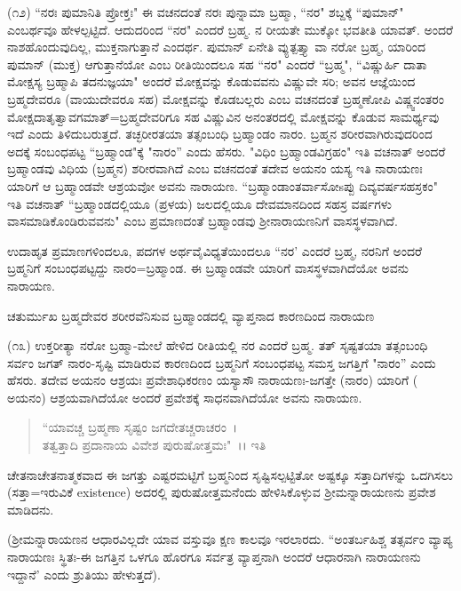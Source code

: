 (೧೨) “ನರಃ ಪುಮಾನಿತಿ ಪ್ರೋಕ್ತಃ" ಈ ವಚನದಂತೆ ನರಃ ಪುನ್ನಾಮಾ ಬ್ರಹ್ಮಾ, ``ನರ" ಶಬ್ದಕ್ಕೆ “ಪುಮಾನ್" ಎಂಬರ್ಥವೂ ಹೇಳಲ್ಪಟ್ಟಿದೆ. ಆದುದರಿಂದ ``ನರ" ಎಂದರೆ ಬ್ರಹ್ಮ. ನ ರೀಯತೇ ಮುಕ್ಕೋ ಭವತೀತಿ ಯಾವತ್. ಅಂದರೆ ನಾಶಹೊಂದುವುದಿಲ್ಲ, ಮುಕ್ತನಾಗುತ್ತಾನೆ ಎಂದರ್ಥ. ಪುಮಾನ್ ಏನೇತಿ ವ್ಯುತ್ಪತ್ತ್ಯಾ ವಾ ನರೋ ಬ್ರಹ್ಮ, ಯಾರಿಂದ ಪುಮಾನ್ (ಮುಕ್ತ) ಆಗುತ್ತಾನೆಯೋ ಎಂಬ ರೀತಿಯಿಂದಲೂ ಸಹ ``ನರ" ಎಂದರೆ ``ಬ್ರಹ್ಮ", ``ವಿಷ್ಣುರ್ಹಿ ದಾತಾ ಮೋಕ್ಷಸ್ಯ ಬ್ರಹ್ಮಾಪಿ ತದನುಜ್ಞಯಾ" ಅಂದರೆ ಮೋಕ್ಷವನ್ನು ಕೊಡುವವನು ವಿಷ್ಣುವೇ ಸರಿ; ಅವನ ಆಜ್ಞೆಯಿಂದ ಬ್ರಹ್ಮದೇವರೂ (ವಾಯುದೇವರೂ ಸಹ) ಮೋಕ್ಷವನ್ನು ಕೊಡಬಲ್ಲರು ಎಂಬ ವಚನದಂತೆ ಬ್ರಹ್ಮಣೋಪಿ ವಿಷ್ಣ್ವನಂತರಂ ಮೋಕ್ಷದಾತೃತ್ವಾವಗಮಾತ್=ಬ್ರಹ್ಮದೇವರಿಗೂ ಸಹ ವಿಷ್ಣುವಿನ ಅನಂತರದಲ್ಲಿ ಮೋಕ್ಷವನ್ನು ಕೊಡುವ ಸಾಮರ್ಥ್ಯವು ಇದೆ ಎಂದು ತಿಳಿದುಬರುತ್ತದೆ. ತಚ್ಛರೀರತಯಾ ತತ್ಸಂಬಂಧಿ ಬ್ರಹ್ಮಾಂಡಂ ನಾರಂ. ಬ್ರಹ್ಮನ ಶರೀರವಾಗಿರುವುದರಿಂದ ಅದಕ್ಕೆ ಸಂಬಂಧಪಟ್ಟ “ಬ್ರಹ್ಮಾಂಡ"ಕ್ಕೆ "ನಾರಂ'' ಎಂದು ಹೆಸರು. "ವಿಧಿಂ ಬ್ರಹ್ಮಾಂಡವಿಗ್ರಹಂ" ಇತಿ ವಚನಾತ್ ಅಂದರೆ ಬ್ರಹ್ಮಾಂಡವು ವಿಧಿಯ (ಬ್ರಹ್ಮನ) ಶರೀರವಾಗಿದೆ ಎಂಬ ವಚನದಂತೆ ತದೇವ ಅಯನಂ ಯಸ್ಯ ಇತಿ ನಾರಾಯಣಃ ಯಾರಿಗೆ ಆ ಬ್ರಹ್ಮಾಂಡವೇ ಆಶ್ರಯವೋ ಅವನು ನಾರಾಯಣ. ``ಬ್ರಹ್ಮಾಂಡಾಂತರ್ವಾಸೋsಪ್ಪು ದಿವ್ಯವರ್ಷಸಹಸ್ರಕಂ" ಇತಿ ವಚನಾತ್ “ಬ್ರಹ್ಮಾಂಡದಲ್ಲಿಯೂ (ಪ್ರಳಯ) ಜಲದಲ್ಲಿಯೂ ದೇವಮಾನದಿಂದ ಸಹಸ್ರ ವರ್ಷಗಳು ವಾಸಮಾಡಿಕೊಂಡಿರುವವನು" ಎಂಬ ಪ್ರಮಾಣದಂತೆ ಬ್ರಹ್ಮಾಂಡವು ಶ‍್ರೀನಾರಾಯಣನಿಗೆ ವಾಸಸ್ಥಳವಾಗಿದೆ.

ಉದಾಹೃತ ಪ್ರಮಾಣಗಳಿಂದಲೂ, ಪದಗಳ ಅರ್ಥವೈವಿಧ್ಯತೆಯಿಂದಲೂ ``ನರ' ಎಂದರೆ ಬ್ರಹ್ಮ, ನರನಿಗೆ ಅಂದರೆ ಬ್ರಹ್ಮನಿಗೆ ಸಂಬಂಧಪಟ್ಟದ್ದು ನಾರಂ=ಬ್ರಹ್ಮಾಂಡ. ಈ ಬ್ರಹ್ಮಾಂಡವೇ ಯಾರಿಗೆ ವಾಸಸ್ಥಳವಾಗಿದೆಯೋ ಅವನು ನಾರಾಯಣ.

\begin{center}
ಚತುರ್ಮುಖ ಬ್ರಹ್ಮದೇವರ ಶರೀರವೆನಿಸುವ ಬ್ರಹ್ಮಾಂಡದಲ್ಲಿ ವ್ಯಾಪ್ತನಾದ ಕಾರಣದಿಂದ ನಾರಾಯಣ
\end{center}

(೧೩) ಉಕ್ತರೀತ್ಯಾ ನರೋ ಬ್ರಹ್ಮಾ-ಮೇಲೆ ಹೇಳಿದ ರೀತಿಯಲ್ಲಿ ನರ ಎಂದರೆ ಬ್ರಹ್ಮ. ತತ್ ಸೃಷ್ಟತಯಾ ತತ್ಸಂಬಂಧಿ ಸರ್ವಂ ಜಗತ್ ನಾರಂ-ಸೃಷ್ಟಿ ಮಾಡಿರುವ ಕಾರಣದಿಂದ ಬ್ರಹ್ಮನಿಗೆ ಸಂಬಂಧಪಟ್ಟ ಸಮಸ್ತ ಜಗತ್ತಿಗೆ "ನಾರಂ'' ಎಂದು ಹೆಸರು. ತದೇವ ಅಯನಂ ಆಶ್ರಯಃ ಪ್ರವೇಶಾಧಿಕರಣಂ ಯಸ್ಯಾಸೌ ನಾರಾಯಣಃ-ಜಗತ್ತೇ (ನಾರಂ) ಯಾರಿಗೆ ( ಅಯನಂ) ಆಶ್ರಯವಾಗಿದೆಯೋ ಅಂದರೆ ಪ್ರವೇಶಕ್ಕೆ ಸಾಧನವಾಗಿದೆಯೋ ಅವನು ನಾರಾಯಣ.

\begin{verse}
 “ಯಾವಚ್ಚ ಬ್ರಹ್ಮಣಾ ಸೃಷ್ಟಂ ಜಗದೇತಚ್ಚರಾಚರಂ~।\\ ತತ್ವತ್ತಾದಿ ಪ್ರದಾನಾಯ ವಿವೇಶ ಪುರುಷೋತ್ತಮಃ"~।। ಇತಿ 
\end{verse}

\noindent
ಚೇತನಾಚೇತನಾತ್ಮಕವಾದ ಈ ಜಗತ್ತು ಎಷ್ಟರಮಟ್ಟಿಗೆ ಬ್ರಹ್ಮನಿಂದ ಸೃಷ್ಟಿಸಲ್ಪಟ್ಟಿತೋ ಅಷ್ಟಕ್ಕೂ ಸತ್ತಾದಿಗಳನ್ನು ಒದಗಿಸಲು (ಸತ್ತಾ=ಇರುವಿಕೆ existence) ಅದರಲ್ಲಿ ಪುರುಷೋತ್ತಮನೆಂದು ಹೇಳಿಸಿಕೊಳ್ಳುವ ಶ‍್ರೀಮನ್ನಾರಾಯಣನು ಪ್ರವೇಶ ಮಾಡಿದನು.

(ಶ‍್ರೀಮನ್ನಾರಾಯಣನ ಆಧಾರವಿಲ್ಲದೇ ಯಾವ ವಸ್ತುವೂ ಕ್ಷಣ ಕಾಲವೂ ಇರಲಾರದು. “ಅಂತರ್ಬಹಿಶ್ಚ ತತ್ಸರ್ವಂ ವ್ಯಾಪ್ಯ ನಾರಾಯಣಃ ಸ್ಥಿತಃ-ಈ ಜಗತ್ತಿನ ಒಳಗೂ ಹೊರಗೂ ಸರ್ವತ್ರ ವ್ಯಾಪ್ತನಾಗಿ ಅಂದರೆ ಆಧಾರನಾಗಿ ನಾರಾಯಣನು ಇದ್ದಾನೆ' ಎಂದು ಶ್ರುತಿಯು ಹೇಳುತ್ತದೆ).

